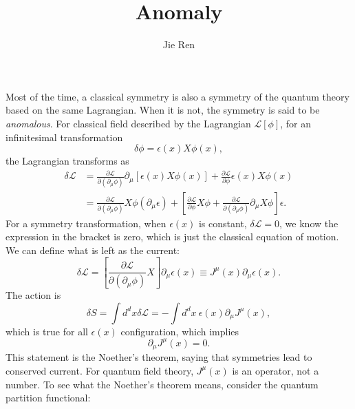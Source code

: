 \documentclass[aps,prb,superscriptaddress,nofootinbib]{revtex4}
\begin{document}
\title{Anomaly}
\author{Jie Ren}



\maketitle



Most of the time, a classical symmetry is also a symmetry of the quantum theory based on the same Lagrangian.
When it is not, the symmetry is said to be \textit{anomalous}.
For classical field described by the Lagrangian $\mathcal L[\phi]$, for an infinitesimal transformation 
\begin{equation}
	\delta\phi = \epsilon(x) X \phi(x),
\end{equation}
the Lagrangian transforms as
\begin{equation}
\begin{aligned}
	\delta \mathcal L 
	&= \frac{\partial \mathcal L}{\partial(\partial_\mu \phi)} \partial_\mu[\epsilon(x) X \phi(x)] + \frac{\partial \mathcal L}{\partial \phi} \epsilon(x) X \phi(x) \\
	&= \frac{\partial \mathcal L}{\partial(\partial_\mu \phi)}X \phi (\partial_\mu\epsilon) + \left[\frac{\partial \mathcal L}{\partial \phi}X\phi + \frac{\partial \mathcal L}{\partial(\partial_\mu \phi)}\partial_\mu X \phi \right]\epsilon.
\end{aligned}
\end{equation}
For a symmetry transformation, when $\epsilon(x)$ is constant, $\delta \mathcal L = 0$, we know the expression in the bracket is zero, which is just the classical equation of motion.
We can define what is left as the current:
\begin{equation}
	\delta \mathcal L = \left[\frac{\partial \mathcal L}{\partial(\partial_\mu \phi)}X \right] \partial_\mu\epsilon(x)
	\equiv J^\mu(x) \partial_\mu \epsilon(x).
\end{equation}
The action is
\begin{equation}
	\delta S = \int d^d x \delta \mathcal L 
	= -\int d^d x\ \epsilon(x) \partial_\mu J^\mu(x),
\end{equation}
which is true for all $\epsilon(x)$ configuration, which implies
\begin{equation}
	\partial_\mu J^\mu(x) = 0.
\end{equation}
This statement is the Noether's theorem, saying that symmetries lead to conserved current.
For quantum field theory, $J^\mu(x)$ is an operator, not a number.
To see what the Noether's theorem means, consider the quantum partition functional:
\end{document}
